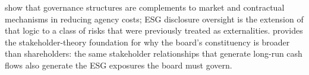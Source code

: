 \textcite{jensen1976agency} show that governance structures are complements to market and
contractual mechanisms in reducing agency costs; ESG disclosure oversight is the extension of
that logic to a class of risks that were previously treated as externalities. \textcite{freeman2010strategic}
provides the stakeholder-theory foundation for why the board's constituency is broader than
shareholders: the same stakeholder relationships that generate long-run cash flows also generate
the ESG exposures the board must govern.
